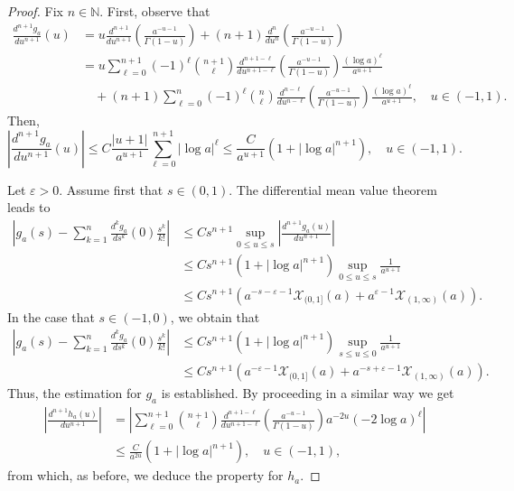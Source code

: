 \documentclass[10pt, a4paper, reqno]{amsart}
\theoremstyle{definition}
\theoremstyle{remark}
\numberwithin{equation}{section}
\begin{document}
\begin{proof}
Fix $n\in \mathbb N$. First, observe that
\begin{align}\label{derivg}
    \frac{d^{n+1}g_a}{du^{n+1}}(u)&=u\frac{d^{n+1}}{du^{n+1}}\left(\frac{a^{-u-1}}{\Gamma (1-u)}\right)+(n+1)\frac{d^n}{du^n}\left(\frac{a^{-u-1}}{\Gamma (1-u)}\right)\nonumber\\
    &=u\sum_{\ell =0}^{n+1}(-1)^\ell\binom{n+1}{\ell }\frac{d^{n+1-\ell}}{du^{n+1-\ell}}\left(\frac{a^{-u-1}}{\Gamma (1-u)}\right)\frac{(\log a)^\ell}{a^{u+1}}\\
    &\quad +(n+1)\sum_{\ell =0}^n(-1)^\ell\binom{n}{\ell}\frac{d^{n-\ell}}{du^{n-\ell}}\left(\frac{a^{-u-1}}{\Gamma (1-u)}\right)\frac{(\log a)^\ell}{a^{u+1}},\quad u\in (-1,1).\nonumber
\end{align}
Then, 
\[
\left|\frac{d^{n+1}g_a}{du^{n+1}}(u)\right|\leq C\frac{|u+1|}{a^{u+1}}\sum_{\ell =0}^{n+1}|\log a|^\ell\leq \frac{C}{a^{u+1}}(1+|\log a|^{n+1}),\quad u\in (-1,1).
\]

Let $\varepsilon >0$. Assume first that $s\in (0,1)$. The differential mean value theorem leads to
\begin{align*}
\left|g_a(s)-\sum_{k=1}^n\frac{d^kg_a}{ds^k}(0)\frac{s^k}{k!}\right|&\leq Cs^{n+1}\sup_{0\leq u\leq s}\left|\frac{d^{n+1}g_a(u)}{du^{n+1}}\right|\\
&\leq Cs^{n+1}(1+|\log a|^{n+1})\sup_{0\leq u\leq s}\frac{1}{a^{u+1}}\\
&\leq Cs^{n+1}\left(a^{-s-\varepsilon-1}\mathcal X_{(0,1]}(a)+a^{\varepsilon -1}\mathcal X_{(1,\infty )}(a)\right).
\end{align*}
In the case that $s\in (-1,0)$, we obtain that
\begin{align*}
\left|g_a(s)-\sum_{k=1}^n\frac{d^kg_a}{ds^k}(0)\frac{s^k}{k!}\right|&\leq Cs^{n+1}(1+|\log a|^{n+1})\sup_{s\leq u\leq 0}\frac{1}{a^{u+1}}\\
&\leq Cs^{n+1}(a^{-\varepsilon-1}\mathcal X_{(0,1]}(a)+a^{-s+\varepsilon -1}\mathcal X_{(1,\infty )}(a)).
\end{align*}
Thus, the estimation for $g_a$ is established. By proceeding in a similar way we get
\begin{align}\label{derivh}
\left|\frac{d^{n+1}h_a(u)}{du^{n+1}}\right|&=\left|\sum_{\ell =0}^{n+1}\binom{n+1}{\ell}\frac{d^{n+1-\ell}}{du^{n+1-\ell}}\left(\frac{a^{-u-1}}{\Gamma (1-u)}\right)a^{-2u}(-2\log a)^\ell\right|\\
&\leq \frac{C}{a^{2u}}(1+|\log a|^{n+1}),\quad u\in (-1,1),\nonumber
\end{align}
from which, as before, we deduce the property for $h_a$.
\end{proof}
\end{document}

